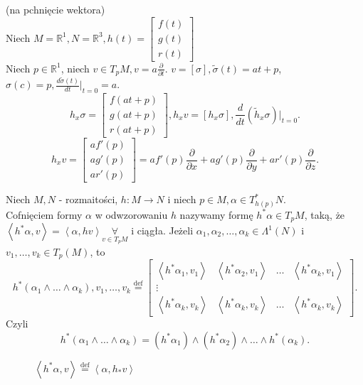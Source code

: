 \documentclass[../main.tex]{subfiles}
\begin{document}
    \begin{przyklad}
        (na pchnięcie wektora)\\
        Niech $M = \mathbb{R}^1, N=\mathbb{R}^3, h(t) = \begin{bmatrix} f(t)\\g(t)\\r(t) \end{bmatrix} $\\
        Niech $p\in \mathbb{R}^1$, niech $v\in T_pM, v = a \frac{\partial }{\partial t} $. $v = [\sigma], \tilde \sigma(t) = at+p$, $\sigma(c) = p, \frac{d \tilde \sigma(t)}{dt}\vert_{t=0} = a$.\\
        \[
            h_x \sigma = \begin{bmatrix} f(at+p)\\g(at+p)\\r(at+p) \end{bmatrix}, h_x v = [h_x \sigma], \frac{d}{dt}(\tilde h_x \sigma)\vert_{t=0}
        .\]
        \[
            h_xv = \begin{bmatrix} af'(p)\\ ag'(p) \\ ar'(p) \end{bmatrix} = af'(p) \frac{\partial }{\partial x} + ag'(p) \frac{\partial }{\partial y} + ar'(p) \frac{\partial }{\partial z}
        .\]
    \end{przyklad}
    \begin{figure}[h]
        \centering
        \label{fig:fig_57}
    \end{figure}

    \pagebreak
    \begin{definicja}
    Niech $M, N$ - rozmaitości, $h: M\to N$ i niech $p\in M, \alpha\in T^*_{h(p)}N$.\\
    Cofnięciem formy $\alpha$ w odwzorowaniu $h$ nazywamy formę $h^*\alpha \in T_pM$, taką, że $\left<h^*\alpha,v \right> = \left<\alpha,hv \right>\underset{v\in T_pM}{\forall} $ i ciągła. Jeżeli $\alpha_1,\alpha_2,\ldots,\alpha_k \in \Lambda^1(N)$ i $v_1,\ldots,v_k\in T_p(M)$, to
    \[
        h^*(\alpha_1\land\ldots\land\alpha_k), v_1,\ldots,v_k \overset{\text{def}}{=} \begin{bmatrix} \left<h^*\alpha_1,v_1 \right>&\left<h^*\alpha_2,v_1 \right>&\ldots&\left<h^*\alpha_k,v_1 \right> \\
            \vdots &&&\\
            \left<h^*\alpha_k,v_k \right>&\left<h^*\alpha_k, v_k \right>&\ldots&\left<h^*\alpha_k,v_k \right>
        \end{bmatrix}
    .\]
    Czyli
    \[
        h^*(\alpha_1\land\ldots\land\alpha_k) = (h^*\alpha_1)\land(h^*\alpha_2)\land\ldots\land h^*(\alpha_k)
    .\]
    \end{definicja}
    \begin{figure}[h]
        \centering
        \caption{$\left<h^*\alpha,v \right> \overset{\text{def}}{=}  \left<\alpha, h_*v \right>$}
        \label{fig:fig_58}
    \end{figure}
\end{document}
